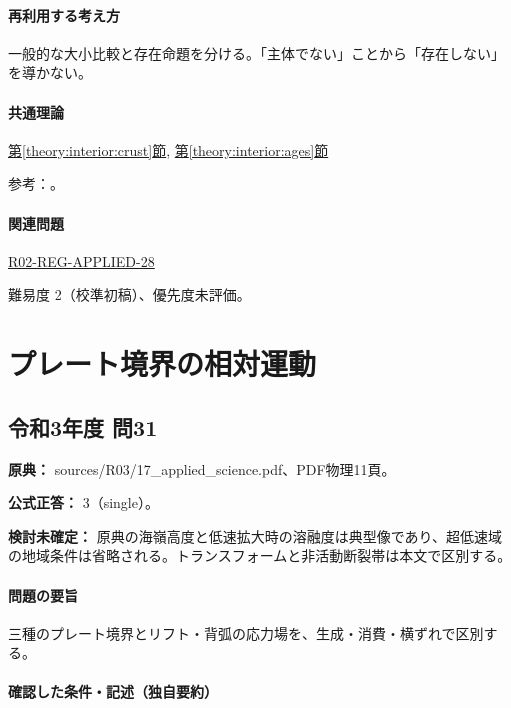 \paragraph{再利用する考え方} 一般的な大小比較と存在命題を分ける。「主体でない」ことから「存在しない」を導かない。

\paragraph{共通理論} \hyperref[theory:interior:crust]{第\ref*{theory:interior:crust}節}, \hyperref[theory:interior:ages]{第\ref*{theory:interior:ages}節}

\par 参考：\cite{usgs_plate_boundaries,umich_crust_teaching}。

\paragraph{関連問題} \hyperref[q:r02-reg-applied-28]{R02-REG-APPLIED-28}

\par 難易度 2（校準初稿）、優先度未評価。

\section{プレート境界の相対運動}

\subsection{令和3年度 問31}
\label{q:r03-reg-applied-31}

\noindent\textbf{原典：} sources/R03/17\_applied\_science.pdf、PDF物理11頁。

\textbf{公式正答：} 3（single）。

\par\textbf{検討未確定：} 原典の海嶺高度と低速拡大時の溶融度は典型像であり、超低速域の地域条件は省略される。トランスフォームと非活動断裂帯は本文で区別する。

\paragraph{問題の要旨} 三種のプレート境界とリフト・背弧の応力場を、生成・消費・横ずれで区別する。

\paragraph{確認した条件・記述（独自要約）}\mbox{}\par

